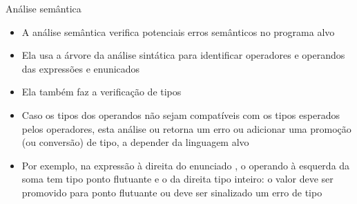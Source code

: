 \begin{frame}[fragile]{Análise semântica}

    \begin{itemize}
        \item A análise semântica verifica potenciais erros semânticos no programa alvo

        \item Ela usa a árvore da análise sintática para identificar operadores e operandos das expressões e enunicados

        \item Ela também faz a verificação de tipos

        \item Caso os tipos dos operandos não sejam compatíveis com os tipos esperados pelos operadores, esta análise ou retorna um erro ou adicionar uma
        promoção (ou conversão) de tipo, a depender da linguagem alvo

        \item Por exemplo, na expressão à direita do enunciado , o operando à esquerda da soma tem tipo ponto flutuante e o da direita
            tipo inteiro: o valor  deve ser promovido para ponto flutuante ou deve ser sinalizado um erro de tipo
    \end{itemize}

\end{frame}


